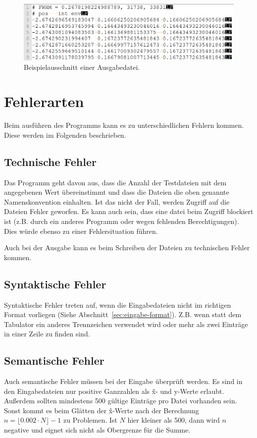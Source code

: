 \begin{figure}[htb]
    \centering
    \includegraphics[width=\linewidth]{images/ausgabeDat_bsp}
    \caption{
        Beispielausschnitt einer Ausgabedatei.
    }
    \label{fig:ausgabe_dat_beispiel}
\end{figure}

\section{Fehlerarten}\label{sec:fehlerarten}
Beim ausführen des Programms kann es zu unterschiedlichen Fehlern kommen.
Diese werden im Folgenden beschrieben.

\subsection{Technische Fehler}\label{subsec:technische-fehler}
Das Programm geht davon aus, dass die Anzahl der Testdateien mit dem angegebenen Wert übereinstimmt und dass die Dateien die oben genannte Namenskonvention einhalten.
Ist das nicht der Fall, werden Zugriff auf die Dateien Fehler geworfen.
Es kann auch sein, dass eine datei beim Zugriff blockiert ist (z.B. durch ein anderes Programm oder wegen fehlenden Berechtigungen).
Dies würde ebenso zu einer Fehlersituation führen.

Auch bei der Ausgabe kann es beim Schreiben der Dateien zu technischen Fehler kommen.

\subsection{Syntaktische Fehler}\label{subsec:syntaktische-fehler}
Syntaktische Fehler treten auf, wenn die Eingabedateien nicht im richtigen Format vorliegen (Siehe Abschnitt~\ref{sec:eingabe-format}).
Z.B. wenn statt dem Tabulator ein anderes Trennzeichen verwendet wird oder mehr als zwei Einträge in einer Zeile zu finden sind.

\subsection{Semantische Fehler}\label{subsec:semantische-fehler}
Auch semantische Fehler müssen bei der Eingabe überprüft werden.
Es sind in den Eingabedateien nur positive Ganzzahlen als \~x- und y-Werte erlaubt.
Außerdem sollten mindestens 500 gültige Einträge pro Datei vorhanden sein.
Sonst kommt es beim Glätten der \~x-Werte nach der Berechnung $n = \lfloor 0.002 \cdot N \rfloor - 1$ zu Problemen.
Ist $N$ hier kleiner als 500, dann wird $n$ negative und eignet sich nicht als Obergrenze für die Summe.

